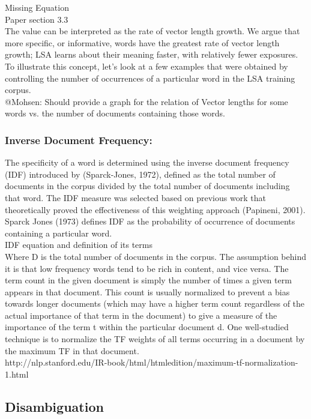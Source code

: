 Missing Equation\\
Paper section 3.3\\
The value can be interpreted as the rate of vector length growth. We argue that more specific, or informative, words have the greatest rate of vector length growth; LSA learns about their meaning faster, with relatively fewer exposures. To illustrate this concept, let's look at a few examples that were obtained by controlling the number of occurrences of a particular word in the LSA training corpus. \\
@Mohsen: Should provide a graph for the relation of Vector lengths for some words vs. the number of documents containing those words.\\

\subsubsection{Inverse Document Frequency:}
The specificity of a word is determined using the inverse document frequency (IDF) introduced by (Sparck-Jones, 1972), defined as the total number of documents in the corpus divided by the total number of documents including that word. The IDF measure was selected based on previous work that theoretically proved the effectiveness of this weighting approach (Papineni, 2001). Sparck Jones (1973) defines IDF as the probability of occurrence of documents containing a particular word.\\
IDF equation and definition of its terms\\
Where D is the total number of documents in the corpus. The assumption behind it is that low frequency words tend to be rich in content, and vice versa.
The term count in the given document is simply the number of times a given term appears in that document. This count is usually normalized to prevent a bias towards longer documents (which may have a higher term count regardless of the actual importance of that term in the document) to give a measure of the importance of the term t within the particular document d. One well-studied technique is to normalize the TF weights of all terms occurring in a document by the maximum TF in that document.\\
http://nlp.stanford.edu/IR-book/html/htmledition/maximum-tf-normalization-1.html
\subsection{Disambiguation}
                                             
